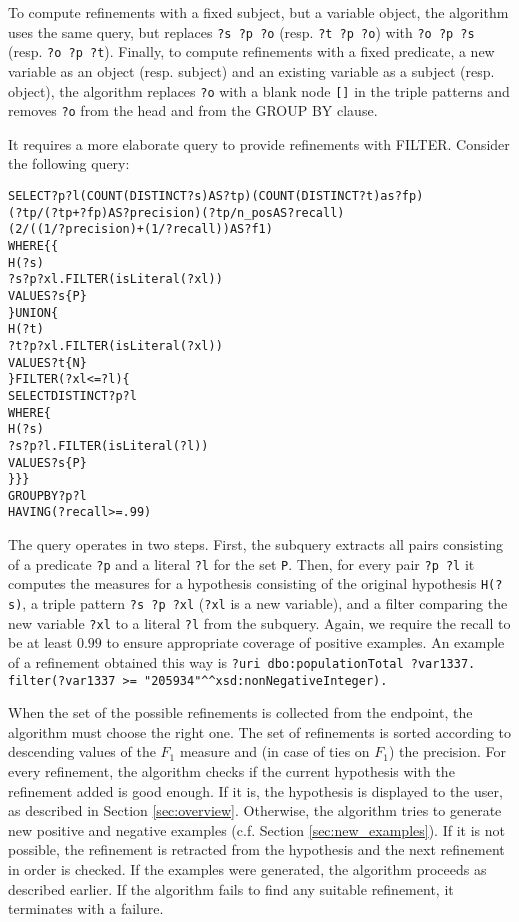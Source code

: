 \documentclass{llncs}
\newcommand{\typedliteral}{\textasciicircum\textasciicircum}
\begin{document}
To compute refinements with a fixed subject, but a variable object, the algorithm uses the same query, but replaces \texttt{?s ?p ?o} (resp. \texttt{?t ?p ?o}) with \texttt{?o ?p ?s} (resp. \texttt{?o ?p ?t}).
Finally, to compute refinements with a fixed predicate, a new variable as an object (resp. subject) and an existing variable as a subject (resp. object), the algorithm replaces \texttt{?o} with a blank node \texttt{[]} in the triple patterns and removes \texttt{?o} from the head and from the GROUP BY clause.

It requires a more elaborate query to provide refinements with FILTER.
Consider the following query:
\begin{alltt}
SELECT ?p ?l (COUNT(DISTINCT ?s) AS ?tp) (COUNT(DISTINCT ?t) as ?fp)
    (?tp/(?tp+?fp) AS ?precision) (?tp/n_pos AS ?recall)
    (2/((1/?precision)+(1/?recall)) AS ?f1)
WHERE \{\{
        H(?s)
        ?s ?p ?xl. FILTER(isLiteral(?xl))
        VALUES ?s \{ P \}
    \} UNION \{
        H(?t)
        ?t ?p ?xl. FILTER(isLiteral(?xl))
        VALUES ?t \{ N \}
    \} FILTER(?xl <= ?l) \{
        SELECT DISTINCT ?p ?l
        WHERE \{
            H(?s)
            ?s ?p ?l. FILTER(isLiteral(?l))
            VALUES ?s \{ P \}
        \}\}\}
GROUP BY ?p ?l
HAVING (?recall >= .99)
\end{alltt}
The query operates in two steps.
First, the subquery extracts all pairs consisting of a predicate \texttt{?p} and a literal \texttt{?l} for the set \texttt{P}.
Then, for every pair \texttt{?p ?l} it computes the measures for a hypothesis consisting of the original hypothesis \texttt{H(?s)}, a triple pattern \texttt{?s ?p ?xl} (\texttt{?xl} is a new variable), and a filter comparing the new variable \texttt{?xl} to a literal \texttt{?l} from the subquery.
Again, we require the recall to be at least $0.99$ to ensure appropriate coverage of positive examples.
An example of a refinement obtained this way is
\texttt{?uri dbo:populationTotal ?var1337. filter(?var1337 >= "205934"\typedliteral xsd:nonNegativeInteger).}

When the set of the possible refinements is collected from the endpoint, the algorithm must choose the right one.
The set of refinements is sorted according to descending values of the $F_1$ measure and (in case of ties on $F_1$) the precision.
For every refinement, the algorithm checks if the current hypothesis with the refinement added is good enough.
If it is, the hypothesis is displayed to the user, as described in Section \ref{sec:overview}.
Otherwise, the algorithm tries to generate new positive and negative examples (c.f. Section \ref{sec:new_examples}).
If it is not possible, the refinement is retracted from the hypothesis and the next refinement in order is checked.
If the examples were generated, the algorithm proceeds as described earlier.
If the algorithm fails to find any suitable refinement, it terminates with a failure.
\end{document}
